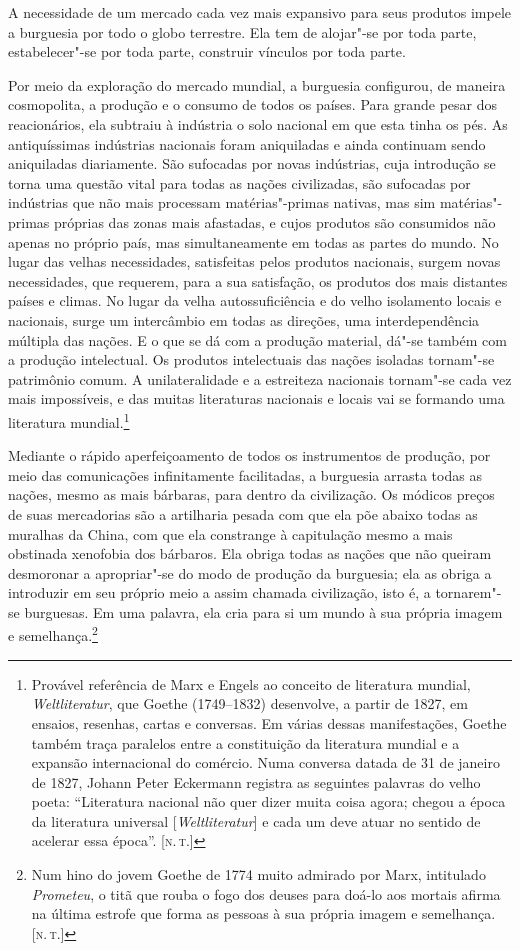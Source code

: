 A necessidade de um mercado cada vez mais expansivo para seus produtos
impele a burguesia por todo o globo terrestre. Ela tem de alojar"-se
por toda parte, estabelecer"-se por toda parte, construir vínculos por
toda parte.

Por meio da exploração do mercado mundial, a burguesia       \label{5}
configurou, de maneira cosmopolita, a produção e o consumo de todos os
países. Para grande pesar dos reacionários, ela subtraiu à indústria o
solo nacional em que esta tinha os pés. As antiquíssimas indústrias
nacionais foram aniquiladas e ainda continuam sendo aniquiladas
diariamente. São sufocadas por novas indústrias, cuja introdução se
torna uma questão vital para todas as nações civilizadas, são sufocadas
por indústrias que não mais processam matérias"-primas nativas, mas
sim matérias"-primas próprias das zonas mais afastadas, e cujos
produtos são consumidos não apenas no próprio país, mas simultaneamente
em todas as partes do mundo. No lugar das velhas necessidades,
satisfeitas pelos produtos nacionais, surgem novas necessidades, que
requerem, para a sua satisfação, os produtos dos mais distantes
países e climas. No lugar da velha autossuficiência e do velho
isolamento locais e nacionais, surge um intercâmbio em todas as
direções, uma interdependência múltipla das nações. E o que se dá com a
produção material, dá"-se também com a produção intelectual. Os
produtos intelectuais das nações isoladas tornam"-se patrimônio comum.
A unilateralidade e a estreiteza nacionais tornam"-se cada vez mais
impossíveis, e das muitas literaturas nacionais e locais vai se
formando uma literatura
mundial.\footnote{Provável referência de Marx e 
Engels ao conceito de literatura mundial, \textit{Weltliteratur}, que
Goethe (1749--1832) desenvolve, a partir de 1827, em ensaios,
resenhas, cartas e conversas. Em várias dessas manifestações, Goethe
também traça paralelos entre a constituição da literatura mundial e a
expansão internacional do comércio. Numa conversa datada de 31 de
janeiro de 1827, Johann Peter Eckermann registra as seguintes palavras
do velho poeta: ``Literatura nacional não quer dizer muita coisa agora;
chegou a época da literatura universal {[}\textit{Weltliteratur}{]} e cada
um deve atuar no sentido de acelerar essa época''.  [\textsc{n.\,t.}]}

Mediante o rápido aperfeiçoamento de todos os instrumentos de produção,
por meio das comunicações infinitamente facilitadas, a burguesia
arrasta todas as nações, mesmo as mais bárbaras, para dentro da
civilização. Os módicos preços de suas mercadorias são a artilharia
pesada com que ela põe abaixo todas as muralhas da China, com que ela
constrange à capitulação mesmo a mais obstinada xenofobia dos bárbaros.
Ela obriga todas as nações que não queiram desmoronar a apropriar"-se
do modo de produção da burguesia; ela as obriga a introduzir em seu
próprio meio a assim chamada civilização, isto é, a tornarem"-se
burguesas. Em uma palavra, ela cria para si um mundo à sua própria
imagem e semelhança.\footnote{Num hino do jovem Goethe de 1774 muito admirado por Marx, intitulado \textit{Prometeu}, o titã que rouba o fogo dos deuses para doá-lo aos mortais afirma na última estrofe que forma as pessoas à sua própria imagem e semelhança. [\textsc{n.\,t.}]}

